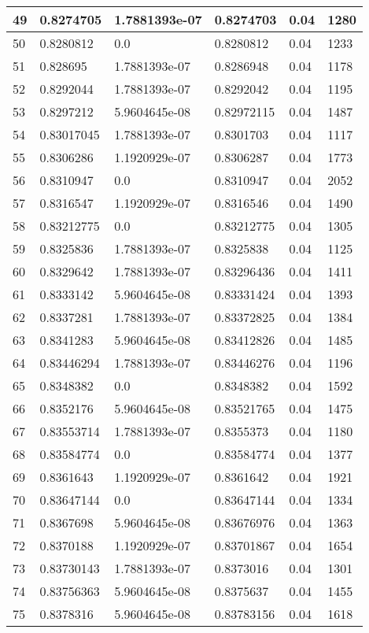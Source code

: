 \begin{longtable}{|l|l|l|l|l|l|}
49 & 0.8274705 & 1.7881393e-07 & 0.8274703 & 0.04 & 1280 \\ \hline 
50 & 0.8280812 & 0.0 & 0.8280812 & 0.04 & 1233 \\ \hline 
51 & 0.828695 & 1.7881393e-07 & 0.8286948 & 0.04 & 1178 \\ \hline 
52 & 0.8292044 & 1.7881393e-07 & 0.8292042 & 0.04 & 1195 \\ \hline 
53 & 0.8297212 & 5.9604645e-08 & 0.82972115 & 0.04 & 1487 \\ \hline 
54 & 0.83017045 & 1.7881393e-07 & 0.8301703 & 0.04 & 1117 \\ \hline 
55 & 0.8306286 & 1.1920929e-07 & 0.8306287 & 0.04 & 1773 \\ \hline 
56 & 0.8310947 & 0.0 & 0.8310947 & 0.04 & 2052 \\ \hline 
57 & 0.8316547 & 1.1920929e-07 & 0.8316546 & 0.04 & 1490 \\ \hline 
58 & 0.83212775 & 0.0 & 0.83212775 & 0.04 & 1305 \\ \hline 
59 & 0.8325836 & 1.7881393e-07 & 0.8325838 & 0.04 & 1125 \\ \hline 
60 & 0.8329642 & 1.7881393e-07 & 0.83296436 & 0.04 & 1411 \\ \hline 
61 & 0.8333142 & 5.9604645e-08 & 0.83331424 & 0.04 & 1393 \\ \hline 
62 & 0.8337281 & 1.7881393e-07 & 0.83372825 & 0.04 & 1384 \\ \hline 
63 & 0.8341283 & 5.9604645e-08 & 0.83412826 & 0.04 & 1485 \\ \hline 
64 & 0.83446294 & 1.7881393e-07 & 0.83446276 & 0.04 & 1196 \\ \hline 
65 & 0.8348382 & 0.0 & 0.8348382 & 0.04 & 1592 \\ \hline 
66 & 0.8352176 & 5.9604645e-08 & 0.83521765 & 0.04 & 1475 \\ \hline 
67 & 0.83553714 & 1.7881393e-07 & 0.8355373 & 0.04 & 1180 \\ \hline 
68 & 0.83584774 & 0.0 & 0.83584774 & 0.04 & 1377 \\ \hline 
69 & 0.8361643 & 1.1920929e-07 & 0.8361642 & 0.04 & 1921 \\ \hline 
70 & 0.83647144 & 0.0 & 0.83647144 & 0.04 & 1334 \\ \hline 
71 & 0.8367698 & 5.9604645e-08 & 0.83676976 & 0.04 & 1363 \\ \hline 
72 & 0.8370188 & 1.1920929e-07 & 0.83701867 & 0.04 & 1654 \\ \hline 
73 & 0.83730143 & 1.7881393e-07 & 0.8373016 & 0.04 & 1301 \\ \hline 
74 & 0.83756363 & 5.9604645e-08 & 0.8375637 & 0.04 & 1455 \\ \hline 
75 & 0.8378316 & 5.9604645e-08 & 0.83783156 & 0.04 & 1618 \\ \hline 
\end{longtable}